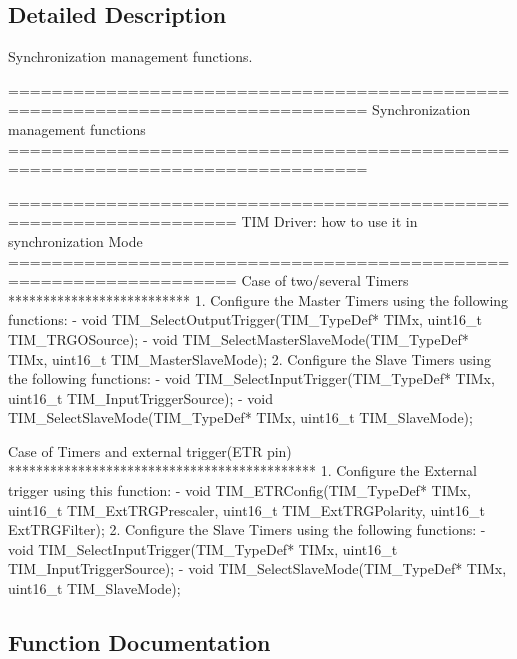 \subsection{Detailed Description}
Synchronization management functions. 

\begin{DoxyVerb} ===============================================================================
                       Synchronization management functions
 ===============================================================================  
                   
       ===================================================================      
              TIM Driver: how to use it in synchronization Mode
       =================================================================== 
       Case of two/several Timers
       **************************
       1. Configure the Master Timers using the following functions:
          - void TIM_SelectOutputTrigger(TIM_TypeDef* TIMx, uint16_t TIM_TRGOSource); 
          - void TIM_SelectMasterSlaveMode(TIM_TypeDef* TIMx, uint16_t TIM_MasterSlaveMode);  
       2. Configure the Slave Timers using the following functions: 
          - void TIM_SelectInputTrigger(TIM_TypeDef* TIMx, uint16_t TIM_InputTriggerSource);  
          - void TIM_SelectSlaveMode(TIM_TypeDef* TIMx, uint16_t TIM_SlaveMode); 
          
       Case of Timers and external trigger(ETR pin)
       ********************************************       
       1. Configure the External trigger using this function:
          - void TIM_ETRConfig(TIM_TypeDef* TIMx, uint16_t TIM_ExtTRGPrescaler, uint16_t TIM_ExtTRGPolarity,
                               uint16_t ExtTRGFilter);
       2. Configure the Slave Timers using the following functions: 
          - void TIM_SelectInputTrigger(TIM_TypeDef* TIMx, uint16_t TIM_InputTriggerSource);  
          - void TIM_SelectSlaveMode(TIM_TypeDef* TIMx, uint16_t TIM_SlaveMode); \end{DoxyVerb}
 

\subsection{Function Documentation}
\mbox{\label{group__TIM__Group7_ga8bdde400b7a30f3e747fe8e4962c0abe}} 
